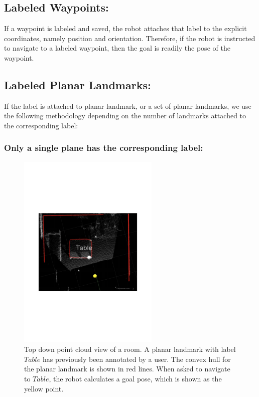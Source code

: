 \subsection{Labeled Waypoints:} If a waypoint is labeled and saved, the robot attaches that label to the explicit coordinates, namely position and orientation. Therefore, if the robot is instructed to navigate to a labeled waypoint, then the goal is readily the pose of the waypoint.
\subsection{Labeled Planar Landmarks:} If the label is attached to planar landmark, or a set of planar landmarks, we use the following methodology depending on the number of landmarks attached to the corresponding label:

\subsubsection{Only a single plane has the corresponding label: }
\label{sec:navigation_goal_single_label}

\begin{figure}[ht!]
\centering
\includegraphics[width=0.6\textwidth]{pics/single_plane}
\caption{Top down point cloud view of a room. A planar landmark with label $Table$ has previously been annotated by a user. The convex hull for the planar landmark is shown in red lines. When asked to navigate to $Table$, the robot calculates a goal pose, which is shown as the yellow point.}
\label{fig:single_plane}
\end{figure}

